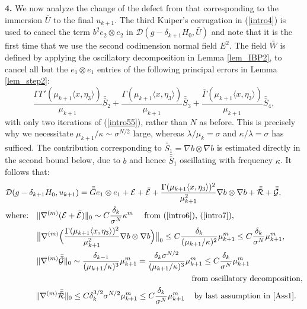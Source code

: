 \documentclass[reqno,twoside,11pt]{amsart}
\newcommand*{\dbar}[1]{\bar{\bar{#1}}}
\numberwithin{equation}{section}
\theoremstyle{plain}
\theoremstyle{definition}
\begin{document}
{\bf 4.} We now analyze the change of the defect from that
corresponding to the immersion $\bar U$ to the final $u_{k+1}$. 
The third Kuiper's corrugation in (\ref{intro4}) is used  to cancel
the term $b^2e_2\otimes e_2$ in $\mathcal{D}(g-\delta_{k+1}H_0, \bar U)$
and note that it is the first time that we
use the second codimension normal field $E^2$.
The field  $\dbar W$ is defined by applying the oscillatory
decomposition in Lemma \ref{lem_IBP2}, to cancel all but the $e_1\otimes e_1$ entries of
the following principal errors in Lemma \ref{lem_step2}:
$$ \frac{\Gamma\Gamma'(\mu_{k+1}\langle x, \eta_3\rangle)}{\mu_{k+1}}\dbar S_2 +
\frac{\Gamma(\mu_{k+1} \langle x, \eta_3\rangle)}{\mu_{k+1}}\dbar S_3 + \frac{\bar\Gamma(\mu_{k+1}
\langle x, \eta_3\rangle)}{\mu_{k+1}}\dbar S_4,$$
with only two iterations of  (\ref{intro55}), rather than $N$ as
before. This is precisely why we necessitate $\mu_{k+1}/\kappa\sim
\sigma^{N/2}$  large, whereas $\lambda/\mu_k =\sigma$ and
$\kappa/\lambda=\sigma$ has sufficed. The contribution corresponding
to $\dbar S_1=\nabla b\otimes \nabla b$ is estimated directly in the
second bound below, due to $b$ and hence $\dbar S_1$
oscillating with frequency $\kappa$. It follows that:
\begin{equation}\label{intro8}
\begin{split}
& \mathcal{D}(g-\delta_{k+1}H_0, u_{k+1})  =
 \dbar G e_1\otimes e_1 + \mathcal{E} + \bar{\mathcal{E}} 
 + \frac{\Gamma(\mu_{k+1} \langle x, \eta_3\rangle)^2}{\mu_{k+1}^2}\nabla b\otimes\nabla b +
\dbar{\mathcal{R}}+ \dbar{\mathcal{G}},
\\ & \mbox{where:} \quad \|\nabla^{(m)}(\mathcal{E} + \bar{\mathcal{E}})\|_0\sim
C \frac{\delta_k}{\sigma^N} \kappa^m \quad \mbox{ from (\ref{intro6}), (\ref{intro7})},\\
& \qquad\quad \;\; \; \big\| \nabla^{(m)}\Big(
\frac{\Gamma(\mu_{k+1} \langle x, \eta_3\rangle)^2}{\mu_{k+1}^2}\nabla
b\otimes\nabla b\Big)\big\|_0\leq C
\frac{\delta_k}{(\mu_{k+1}/\kappa)^2}\mu_{k+1}^m \leq C\frac{\delta_k}{\sigma^{N}}\mu_{k+1}^m,
\\ & \qquad\quad \;\; \; \|\nabla^{(m)}\dbar{\mathcal{G}}\|_0\sim 
\frac{\delta_{k-1}}{(\mu_{k+1}/\kappa)^{3}} \mu_{k+1}^m =
\frac{\delta_k \sigma^{N/2}}{(\mu_{k+1}/\kappa)^{3}} \mu_{k+1}^m \leq 
C \frac{\delta_k}{\sigma^{N}}\mu_{k+1}^m
\\ & \qquad\qquad\qquad \qquad\qquad \qquad\qquad \qquad\quad 
\qquad\qquad \qquad
\mbox{from oscillatory decomposition},\\
& \qquad\quad \;\; \, \|\nabla^{(m)}\dbar{\mathcal{R}}\|_0\leq C
\delta_k^{3/2}\sigma^{N/2}\mu_{k+1}^m\leq C \frac{\delta_k}{\sigma^{N}}\mu_{k+1}^m 
\quad \, \mbox{by last assumption in \ref{Ass1}}.
\end{split}
\end{equation}
\end{document}
